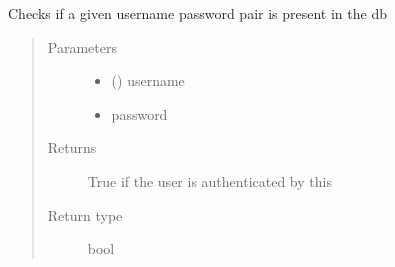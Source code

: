 \documentclass[letterpaper,10pt,english]{sphinxmanual}
\begin{document}
\begin{fulllineitems}
\label{\detokenize{db:db.login}}
Checks if a given username password pair is present in the db
\begin{quote}\begin{description}
\item[{Parameters}] \leavevmode\begin{itemize}
\item {} 
 () \textendash{} username

\item {} 
 \textendash{} password

\end{itemize}

\item[{Returns}] \leavevmode
True if the user is authenticated by this

\item[{Return type}] \leavevmode
bool

\end{description}\end{quote}

\end{fulllineitems}

\end{document}

